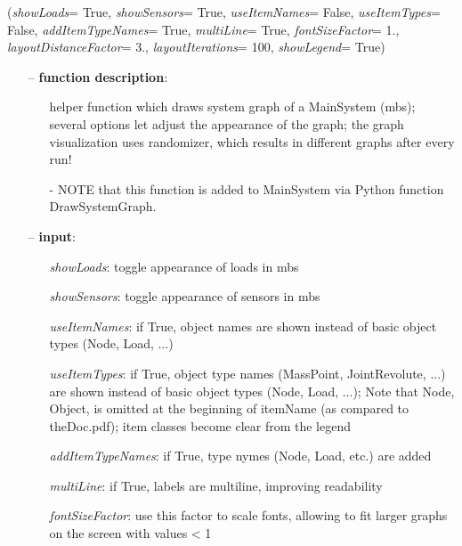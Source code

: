 %
\begin{flushleft}
\label{sec:mainsystemextensions:DrawSystemGraph}
({\it showLoads}= True, {\it showSensors}= True, {\it useItemNames}= False, {\it useItemTypes}= False, {\it addItemTypeNames}= True, {\it multiLine}= True, {\it fontSizeFactor}= 1., {\it layoutDistanceFactor}= 3., {\it layoutIterations}= 100, {\it showLegend}= True)
\end{flushleft}
\setlength{\itemindent}{0.7cm}
\begin{itemize}[leftmargin=0.7cm]
\item[--]
{\bf function description}: \vspace{-6pt}
\begin{itemize}[leftmargin=1.2cm]
\setlength{\itemindent}{-0.7cm}
\item[]helper function which draws system graph of a MainSystem (mbs); several options let adjust the appearance of the graph; the graph visualization uses randomizer, which results in different graphs after every run!
\item[]- NOTE that this function is added to MainSystem via Python function DrawSystemGraph.
\end{itemize}
\item[--]
{\bf input}: \vspace{-6pt}
\begin{itemize}[leftmargin=1.2cm]
\setlength{\itemindent}{-0.7cm}
\item[]{\it showLoads}: toggle appearance of loads in mbs
\item[]{\it showSensors}: toggle appearance of sensors in mbs
\item[]{\it useItemNames}: if True, object names are shown instead of basic object types (Node, Load, ...)
\item[]{\it useItemTypes}: if True, object type names (MassPoint, JointRevolute, ...) are shown instead of basic object types (Node, Load, ...); Note that Node, Object, is omitted at the beginning of itemName (as compared to theDoc.pdf); item classes become clear from the legend
\item[]{\it addItemTypeNames}: if True, type nymes (Node, Load, etc.) are added
\item[]{\it multiLine}: if True, labels are multiline, improving readability
\item[]{\it fontSizeFactor}: use this factor to scale fonts, allowing to fit larger graphs on the screen with values < 1

\end{itemize}
\end{itemize}
